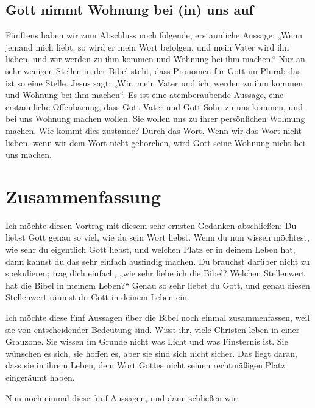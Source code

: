 \subsection{Gott nimmt Wohnung bei (in) uns auf}

Fünftens haben wir zum Abschluss noch folgende, erstaunliche Aussage: „Wenn jemand mich liebt, so wird er mein Wort befolgen, und mein Vater wird ihn lieben, und wir werden zu ihm kommen und Wohnung bei ihm machen.“ 
Nur an sehr wenigen Stellen in der Bibel steht, dass Pronomen für Gott im Plural; das ist so eine Stelle. 
Jesus sagt: „Wir, mein Vater und ich, werden zu ihm kommen und Wohnung bei ihm machen“. 
Es ist eine atemberaubende Aussage, eine erstaunliche Offenbarung, dass Gott Vater und Gott Sohn zu uns kommen, und bei uns Wohnung machen wollen. 
Sie wollen uns zu ihrer persönlichen Wohnung machen. 
Wie kommt dies zustande? 
Durch das Wort. 
Wenn wir das Wort nicht lieben, wenn wir dem Wort nicht gehorchen, wird Gott seine Wohnung nicht bei uns machen.

\section{Zusammenfassung}

Ich möchte diesen Vortrag mit diesem sehr ernsten Gedanken abschließen: Du liebst Gott genau so viel, wie du sein Wort liebst. 
Wenn du nun wissen möchtest, wie sehr du eigentlich Gott liebst, und welchen Platz er in deinem Leben hat, dann kannst du das sehr einfach ausfindig machen. Du brauchst darüber nicht zu spekulieren; frag dich einfach, „wie sehr liebe ich die Bibel?
Welchen Stellenwert hat die Bibel in meinem Leben?“
Genau so sehr liebst du Gott, und genau diesen Stellenwert räumst du Gott in deinem Leben ein.

Ich möchte diese fünf Aussagen über die Bibel noch einmal zusammenfassen, weil sie von entscheidender Bedeutung sind. 
Wisst ihr, viele Christen leben in einer Grauzone. Sie wissen im Grunde nicht was Licht und was Finsternis ist. 
Sie wünschen es sich, sie hoffen es, aber sie sind sich nicht sicher. 
Das liegt daran, dass sie in ihrem Leben, dem Wort Gottes nicht seinen rechtmäßigen Platz eingeräumt haben.

Nun noch einmal diese fünf Aussagen, und dann schließen wir:

